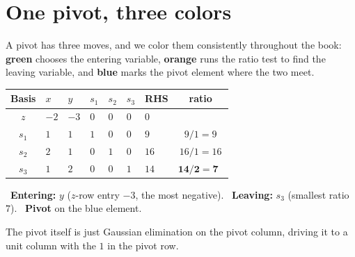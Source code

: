 \section{One pivot, three colors}
\label{sec:tableau-pivot}

A pivot has three moves, and we color them consistently throughout the book: {\color{algenter}\textbf{green}} chooses the entering variable, {\color{algleave}\textbf{orange}} runs the ratio test to find the leaving variable, and {\color{algpivot}\textbf{blue}} marks the pivot element where the two meet.

\begin{center}
\renewcommand{\arraystretch}{1.3}
\begin{tabular}{c|ZZZZZ|Z|c}
\toprule
Basis & $x$ & $y$ & $s_1$ & $s_2$ & $s_3$ & RHS & ratio\\
\midrule
$z$   & $-2$ & $-3$ & $0$ & $0$ & $0$ & $0$ & \\
\midrule
$s_1$ & $1$ & $1$ & $1$ & $0$ & $0$ & $9$  & $9/1=9$\\
$s_2$ & $2$ & $1$ & $0$ & $1$ & $0$ & $16$ & $16/1=16$\\
$s_3$ & $1$ & $2$ & $0$ & $0$ & $1$ & $14$ & $\mathbf{14/2=7}$\ \\
\bottomrule
\end{tabular}
\end{center}

\noindent%
{\color{algenter}\ \textbf{Entering:}} $y$ ($z$-row entry $-3$, the most negative).\quad
{\color{algleave}\ \textbf{Leaving:}} $s_3$ (smallest ratio $7$).\quad
{\color{algpivot}\ \textbf{Pivot}} on the blue element.

\medskip
The pivot itself is just Gaussian elimination on the pivot column, driving it to a unit column with the $1$ in the pivot row.

